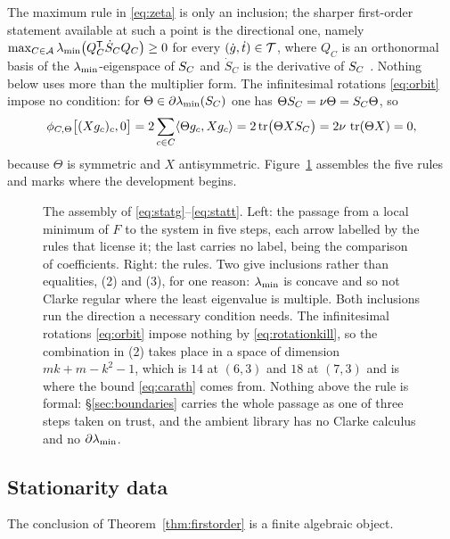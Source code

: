 The maximum rule in \eqref{eq:zeta} is only an inclusion; the sharper
first-order statement available at such a point is the directional one,
namely
$\max_{C\in\mathcal{A}}\lambda_{\min}\bigl(Q_C^{\mathsf{T}}\dot S_CQ_C\bigr)\ge0$ for every
$(\dot g,\dot t)\in \mathcal{T}$, where $Q_C$ is an orthonormal basis of the
$\lambda_{\min}$-eigenspace of $S_{C}$ and $\dot S_C$ is the derivative of $S_{C}$
\cite{HiriartUrrutyYe1995,Danskin1967}.  Nothing below uses more than the
multiplier form.  The infinitesimal rotations \eqref{eq:orbit} impose no
condition: for $\Theta\in\partial\lambda_{\min}(S_{C})$ one has
$\Theta S_{C}=\nu\Theta=S_{C}\Theta$, so
\begin{equation}\label{eq:rotationkill}
  \phi_{C,\Theta}\bigl[(Xg_c)_c,0\bigr]
  =2\sum_{c\in C}\langle\Theta g_c,Xg_c\rangle
  =2\operatorname{tr}\bigl(\Theta XS_{C}\bigr)=2\nu\,\operatorname{tr}(\Theta X)=0,
\end{equation}
because $\Theta$ is symmetric and $X$ antisymmetric.
Figure~\ref{fig:kktassembly} assembles the five rules and marks where the
development begins.

\begin{figure}[ht]
  \centering
  
  \caption{The assembly of \eqref{eq:statg}--\eqref{eq:statt}.  Left: the
  passage from a local minimum of $F$ to the system in five steps, each arrow
  labelled by the rules that license it; the last carries no label, being the
  comparison of coefficients.  Right: the rules.  Two give inclusions rather
  than equalities, (2) and (3), for one reason: $\lambda_{\min}$ is concave and so not
  Clarke regular where the least eigenvalue is multiple.  Both inclusions run
  the direction a necessary condition needs.  The infinitesimal rotations
  \eqref{eq:orbit} impose nothing by \eqref{eq:rotationkill}, so the
  combination in (2) takes place in a space of dimension $mk+m-k^{2}-1$, which
  is $14$ at $(6,3)$ and $18$ at $(7,3)$ and is where the bound
  \eqref{eq:carath} comes from.  Nothing above the rule is formal:
  \S\ref{sec:boundaries} carries the whole passage as one of three steps taken
  on trust, and the ambient library has no Clarke calculus and no
  $\partial\lambda_{\min}$.}
  \label{fig:kktassembly}
\end{figure}

\subsection{Stationarity data}\label{sec:data}

The conclusion of Theorem~\ref{thm:firstorder} is a finite algebraic
object.

